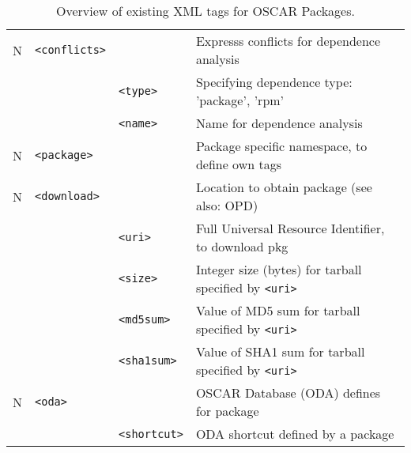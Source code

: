 \begin{table}[h!]
\begin{small}
\begin{center}
\begin{tabular}{|c|l|l|l|}
  N & \verb|<conflicts>|
  		&   
		& Expresss conflicts for dependence analysis
		\\\cline{3-4}
%
    & 
		& \verb|<type>|    
		& Specifying dependence type: 'package', 'rpm'
		\\\cline{3-4}
%
	&
		& \verb|<name>|
		& Name for dependence analysis
		\\\hline

  N & \verb|<package>| 
		&    
		& Package specific namespace, to define own tags
		\\\hline

  N & \verb|<download>| 
		&    
		& Location to obtain package (see also: OPD)
		\\\cline{3-4}
%
    & 
		& \verb|<uri>|   
		& Full Universal Resource Identifier, to download pkg
		\\\cline{3-4}
%
    & 
		& \verb|<size>|   
		& Integer size (bytes) for tarball specified by \verb|<uri>|
		\\\cline{3-4}
%
    & 
		& \verb|<md5sum>|   
		& Value of MD5 sum for tarball specified by \verb|<uri>|
		\\\cline{3-4}
%
    & 
		& \verb|<sha1sum>|   
		& Value of SHA1 sum for tarball specified by \verb|<uri>|
		\\\hline

  N & \verb|<oda>|     
		&    
		& OSCAR Database (ODA) defines for package     
		\\\cline{3-4}
%
    & 
		& \verb|<shortcut>|   
		& ODA shortcut defined by a package            
		\\\hline


  \end{tabular}
  \end{center}  
\end{small}
  \caption{Overview of existing XML tags for OSCAR Packages.}  
  \label{tab:pkg-xml-tags}
\end{table}
